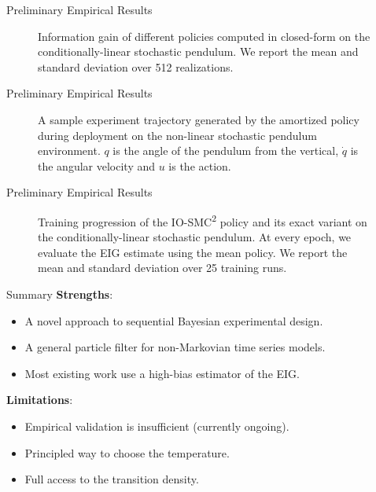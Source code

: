 \documentclass[10pt, aspectratio=1610]{beamer}
\begin{document}
    \begin{frame}{Preliminary Empirical Results}
      \begin{figure}[t]
        
        \vspace{-0.25cm}
        \caption{Information gain of different policies computed in closed-form on the conditionally-linear stochastic pendulum. We report the mean and standard deviation over 512 realizations.}
        \label{fig:pendulum_info_gain}
      \end{figure}
    \end{frame}

    \begin{frame}{Preliminary Empirical Results}
      \begin{figure}[!h]
        \centering
        
        \vspace{-0.25cm}
        \caption{A sample experiment trajectory generated by the amortized policy during deployment on the non-linear stochastic pendulum environment. $q$ is the angle of the pendulum from the vertical, $\dot{q}$ is the angular velocity and $u$ is the action.}
      \end{figure}
    \end{frame}

    \begin{frame}{Preliminary Empirical Results}
      \begin{figure}[t]
        
        \caption{Training progression of the IO-SMC\textsuperscript{2} policy and its exact variant on the conditionally-linear stochastic pendulum. At every epoch, we evaluate the EIG estimate using the mean policy. We report the mean and standard deviation over 25 training runs.}
      \end{figure}
    \end{frame}

    \begin{frame}{Summary}
      \textbf{Strengths}:\vspace{1em}
      \begin{itemize}
        \setlength\itemsep{1em}
        \item A novel approach to sequential Bayesian experimental design.
        \item A general particle filter for non-Markovian time series models.
        \item Most existing work use a high-bias estimator of the EIG.
      \end{itemize}
      \vspace{1em}
      \textbf{Limitations}:\vspace{1em}
      \begin{itemize}
        \setlength\itemsep{1em}
        \item Empirical validation is insufficient (currently ongoing).
        \item Principled way to choose the temperature.
        \item Full access to the transition density.
      \end{itemize}
    \end{frame}
\end{document}
